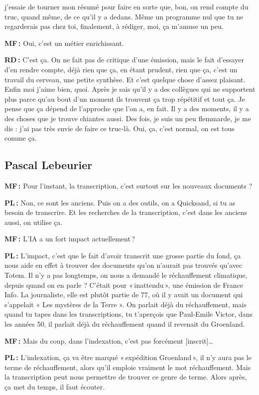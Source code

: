 j'essaie de tourner mon résumé pour faire en sorte que, bon, on rend compte du truc, quand même, de ce qu'il y a dedans. Même un programme nul que tu ne regarderais pas chez toi, finalement, à rédiger, moi, ça m'amuse un peu.

\textbf{MF :} Oui, c'est un métier enrichissant.   

\textbf{RD :} C'est ça. On ne fait pas de critique d’une émission, mais le fait d'essayer d’en rendre compte, déjà rien que ça, en étant prudent, rien que ça, c'est un travail du cerveau, une petite synthèse.  Et c'est quelque chose d'assez plaisant. Enfin moi j'aime bien, quoi. Après je sais qu'il y a des collègues qui ne supportent plus parce qu'au bout d'un moment ils trouvent ça trop répétitif et tout ça. Je pense que ça dépend de l'approche que l'on a, en fait. Il y a des moments, il y a des choses que je trouve chiantes aussi. Des fois, je suis un peu flemmarde, je me dis : j'ai pas très envie de faire ce truc-là. Oui, ça, c'est normal, on est tous comme ça.

\subsection*{Pascal Lebeurier }

\textbf{MF :} Pour l'instant, la transcription, c'est surtout sur les nouveaux documents ?  

\textbf{PL :} Non, ce sont les anciens. Puis on a des outils, on a Quicksand, si tu as besoin de transcrire. Et les recherches de la transcription, c’est dans les anciens aussi, on utilise ça. 

\textbf{MF :} L’IA a un fort impact actuellement ? 

\textbf{PL :} L'impact, c'est que le fait d'avoir transcrit une grosse partie du fond, ça nous aide en effet à trouver des documents qu'on n'aurait pas trouvés qu'avec Totem. Il n'y a pas longtemps, on nous a demandé le réchauffement climatique, depuis quand on en parle ? C’était pour « inattendu », une émission de France Info. La journaliste, elle est plutôt partie de 77, où il y avait un document qui s'appelait « Les mystères de la Terre ». On parlait déjà du réchauffement, mais quand tu tapes dans les transcriptions, tu t'aperçois que Paul-Emile Victor, dans les années 50, il parlait déjà du réchauffement quand il revenait du Groenland. 

\textbf{MF :} Mais du coup, dans l'indexation, c'est pas forcément [inscrit]… 

\textbf{PL :} L'indexation, ça va être marqué « expédition Groenland », il n'y aura pas le terme de réchauffement, alors qu'il emploie vraiment le mot réchauffement. Mais la transcription peut nous permettre de trouver ce genre de terme. Alors après, ça met du temps, il faut écouter. 

